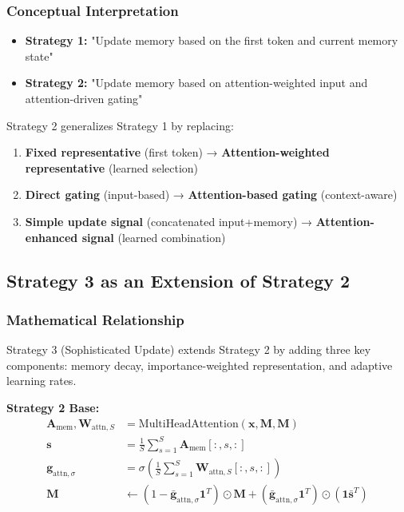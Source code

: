 \documentclass{article}
\begin{document}
\subsubsection{Conceptual Interpretation}

\begin{itemize}
\item \textbf{Strategy 1:} "Update memory based on the first token and current memory state"
\item \textbf{Strategy 2:} "Update memory based on attention-weighted input and attention-driven gating"
\end{itemize}

Strategy 2 generalizes Strategy 1 by replacing:
\begin{enumerate}
\item \textbf{Fixed representative} (first token) → \textbf{Attention-weighted representative} (learned selection)
\item \textbf{Direct gating} (input-based) → \textbf{Attention-based gating} (context-aware)
\item \textbf{Simple update signal} (concatenated input+memory) → \textbf{Attention-enhanced signal} (learned combination)
\end{enumerate}

\subsection{Strategy 3 as an Extension of Strategy 2}

\subsubsection{Mathematical Relationship}

Strategy 3 (Sophisticated Update) extends Strategy 2 by adding three key components: memory decay, importance-weighted representation, and adaptive learning rates.

\textbf{Strategy 2 Base:}
\begin{align}
\mathbf{A}_{\text{mem}}, \mathbf{W}_{\text{attn},S} &= \text{MultiHeadAttention}(\mathbf{x}, \mathbf{M}, \mathbf{M}) \\
\mathbf{s} &= \frac{1}{S}\sum_{s=1}^{S} \mathbf{A}_{\text{mem}}[:, s, :] \\
\mathbf{g}_{\text{attn},\sigma} &= \sigma\left(\frac{1}{S}\sum_{s=1}^{S} \mathbf{W}_{\text{attn},S}[:, s, :]\right) \\
\mathbf{M} &\leftarrow (1 - \bar{\mathbf{g}}_{\text{attn},\sigma} \mathbf{1}^T) \odot \mathbf{M} + (\bar{\mathbf{g}}_{\text{attn},\sigma} \mathbf{1}^T) \odot (\mathbf{1} \bar{\mathbf{s}}^T)
\end{align}
\end{document}

